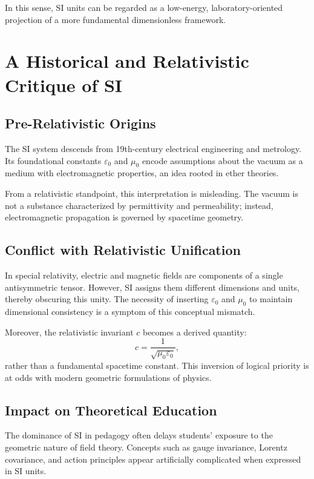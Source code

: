 \documentclass[12pt]{article}
\begin{document}
In this sense, SI units can be regarded as a low-energy, laboratory-oriented projection of a more fundamental dimensionless framework.

\section{A Historical and Relativistic Critique of SI}

\subsection{Pre-Relativistic Origins}

The SI system descends from 19th-century electrical engineering and metrology. Its foundational constants $\varepsilon_0$ and $\mu_0$ encode assumptions about the vacuum as a medium with electromagnetic properties, an idea rooted in ether theories.

From a relativistic standpoint, this interpretation is misleading. The vacuum is not a substance characterized by permittivity and permeability; instead, electromagnetic propagation is governed by spacetime geometry.

\subsection{Conflict with Relativistic Unification}

In special relativity, electric and magnetic fields are components of a single antisymmetric tensor. However, SI assigns them different dimensions and units, thereby obscuring this unity. The necessity of inserting $\varepsilon_0$ and $\mu_0$ to maintain dimensional consistency is a symptom of this conceptual mismatch.

Moreover, the relativistic invariant $c$ becomes a derived quantity:
\[
c = \frac{1}{\sqrt{\mu_0 \varepsilon_0}},
\]
rather than a fundamental spacetime constant. This inversion of logical priority is at odds with modern geometric formulations of physics.

\subsection{Impact on Theoretical Education}

The dominance of SI in pedagogy often delays students’ exposure to the geometric nature of field theory. Concepts such as gauge invariance, Lorentz covariance, and action principles appear artificially complicated when expressed in SI units.
\end{document}
